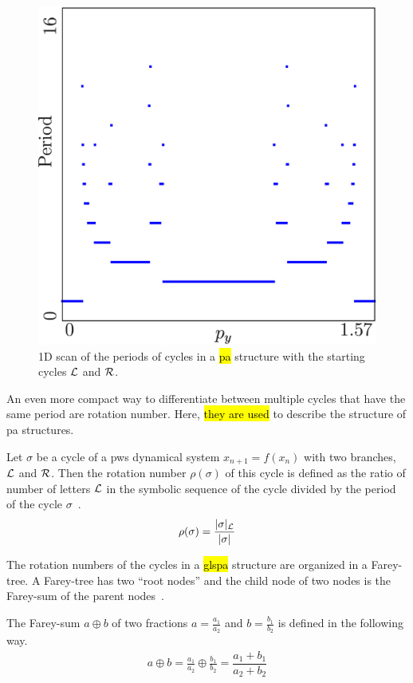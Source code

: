 \begin{figure}
	\centering
	\includegraphics[width=.5 \textwidth]{../Figures/2/2.1/result.png}
	\caption[1D scan of periods in a  structure between $\L$ and $\R$]{
		1D scan of the periods of cycles in a \hl{\gls{pa}} structure with the starting cycles $\L$ and $\R$.
	}
\end{figure}

An even more compact way to differentiate between multiple cycles that have the same period are rotation number.
Here, \hl{they are used} to describe the structure of \gls{pa} structures.

\begin{definition}
	\label{def:rotation.numbers}
	Let $\sigma$ be a cycle of a \gls{pws} dynamical system $x_{n+1} = f(x_n)$ with two branches, $\L$ and $\R$.
	Then the rotation number $\rho(\sigma)$ of this cycle is defined as the ratio of number of letters $\L$ in the symbolic sequence of the cycle divided by the period of the cycle $\sigma$~\cite{Keener80}.
	\begin{align}
		\rho(\sigma) = \dfrac{|\sigma|_{\mathcal{L}}}{|\sigma|}
	\end{align}
\end{definition}

The rotation numbers of the cycles in a \hl{gls{pa}} structure are organized in a Farey-tree.
A Farey-tree has two ``root nodes'' and the child node of two nodes is the Farey-sum of the parent nodes~\cite{granados14adding}.

\begin{definition}
	The Farey-sum $a \oplus b$ of two fractions $a = \frac{a_1}{a_2}$ and $b = \frac{b_1}{b_2}$ is defined in the following way.
	\begin{align}
		a \oplus b = \frac{a_1}{a_2} \oplus \frac{b_1}{b_2} = \dfrac{a_1 + b_1}{a_2 + b_2}
	\end{align}
\end{definition}

